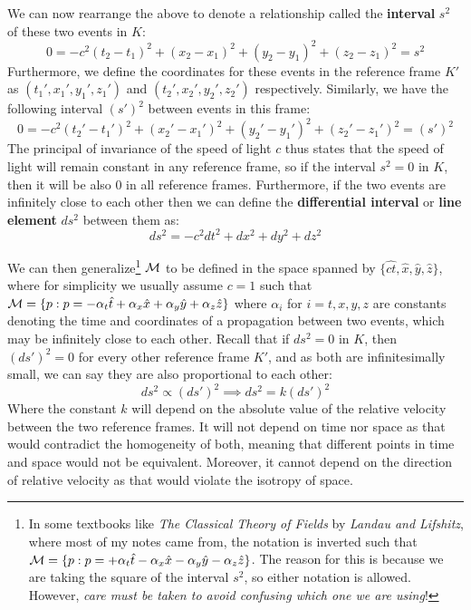 \documentclass{article}
\begin{document}
			We can now rearrange the above to denote a relationship called the \textbf{interval} $s^2$ of these two events in $K$:
			\begin{equation}
				\label{eq:Interval}
				\boxed{0 = - c^2 (t_2 - t_1)^2 + (x_2 - x_1)^2 + (y_2 - y_1)^2 + (z_2 - z_1)^2 = s^2}
			\end{equation}
			Furthermore, we define the coordinates for these events in the reference frame $K'$ as $(t_1', x_1', y_1', z_1')$ and $(t_2', x_2', y_2', z_2')$ respectively. Similarly, we have the following interval $(s')^2$ between events in this frame:
			$$ 0 = - c^2 (t_2' - t_1')^2 + (x_2' - x_1')^2 + (y_2' - y_1')^2 + (z_2' - z_1')^2 = (s')^2$$
			The principal of invariance of the speed of light $c$ thus states that the speed of light will remain constant in any reference frame, so if the interval $s^2 = 0$ in $K$, then it will be also 0 in all reference frames. Furthermore, if the two events are infinitely close to each other then we can define the \textbf{differential interval} or \textbf{line element} $ds^2$ between them as:
			\begin{equation}
				\label{eq:IntervalDifferential}
				\boxed{ds^2 =  - c^2 dt^2 + dx^2 + dy^2 + dz^2}
			\end{equation}
		
		
			We can then generalize\footnote{In some textbooks like \textit{The Classical Theory of Fields} by \textit{Landau and Lifshitz}, where most of my notes came from, the notation is inverted such that $\mathcal{M} = \{ p: p = +\alpha_t \hat{t} - \alpha_x \hat{x} - \alpha_y \hat{y} - \alpha_z \hat{z} \}$. The reason for this is because we are taking the square of the interval $s^2$, so either notation is allowed. However, \textit{care must be taken to avoid confusing which one we are using}!} $\mathcal{M}$ to be defined in the space spanned by $\{ \hat{ct}, \hat{x}, \hat{y}, \hat{z}\}$, where for simplicity we usually assume $c=1$ such that $\mathcal{M} = \{ p: p = -\alpha_t \hat{t} + \alpha_x \hat{x} + \alpha_y \hat{y} + \alpha_z \hat{z} \}$ where $\alpha_i$ for $i = t,x,y,z$ are constants denoting the time and coordinates of a propagation between two events, which may be infinitely close to each other. Recall that if $ds^2 = 0$ in $K$, then $(ds')^2 = 0$ for every other reference frame $K'$, and as both are infinitesimally small, we can say they are also proportional to each other:
			$$ ds^2 \propto (ds')^2 \implies ds^2 = k (ds')^2$$
			Where the constant $k$ will depend on the absolute value of the relative velocity between the two reference frames. It will not depend on time nor space as that would contradict the homogeneity of both, meaning that different points in time and space would not be equivalent. Moreover, it cannot depend on the direction of relative velocity as that would violate the isotropy of space.
			
\end{document}
